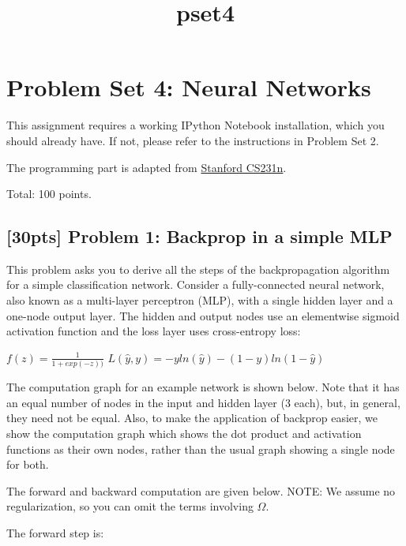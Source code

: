 \documentclass[11pt]{article}
\title{pset4}
\begin{document}
    
    
    \maketitle
    
    

    
    \hypertarget{problem-set-4-neural-networks}{%
\section{Problem Set 4: Neural
Networks}\label{problem-set-4-neural-networks}}

This assignment requires a working IPython Notebook installation, which
you should already have. If not, please refer to the instructions in
Problem Set 2.

The programming part is adapted from
\href{http://cs231n.stanford.edu/}{Stanford CS231n}.

Total: 100 points.

    \hypertarget{pts-problem-1-backprop-in-a-simple-mlp}{%
\subsection{{[}30pts{]} Problem 1: Backprop in a simple
MLP}\label{pts-problem-1-backprop-in-a-simple-mlp}}

This problem asks you to derive all the steps of the backpropagation
algorithm for a simple classification network. Consider a
fully-connected neural network, also known as a multi-layer perceptron
(MLP), with a single hidden layer and a one-node output layer. The
hidden and output nodes use an elementwise sigmoid activation function
and the loss layer uses cross-entropy loss:

\(f(z)=\frac{1}{1+exp(-z))}\)
\(L(\hat{y},y)=-yln(\hat{y}) - (1-y)ln(1-\hat{y})\)

The computation graph for an example network is shown below. Note that
it has an equal number of nodes in the input and hidden layer (3 each),
but, in general, they need not be equal. Also, to make the application
of backprop easier, we show the computation graph which shows the dot
product and activation functions as their own nodes, rather than the
usual graph showing a single node for both.

The forward and backward computation are given below. NOTE: We assume no
regularization, so you can omit the terms involving \(\Omega\).

The forward step is:
\end{document}
